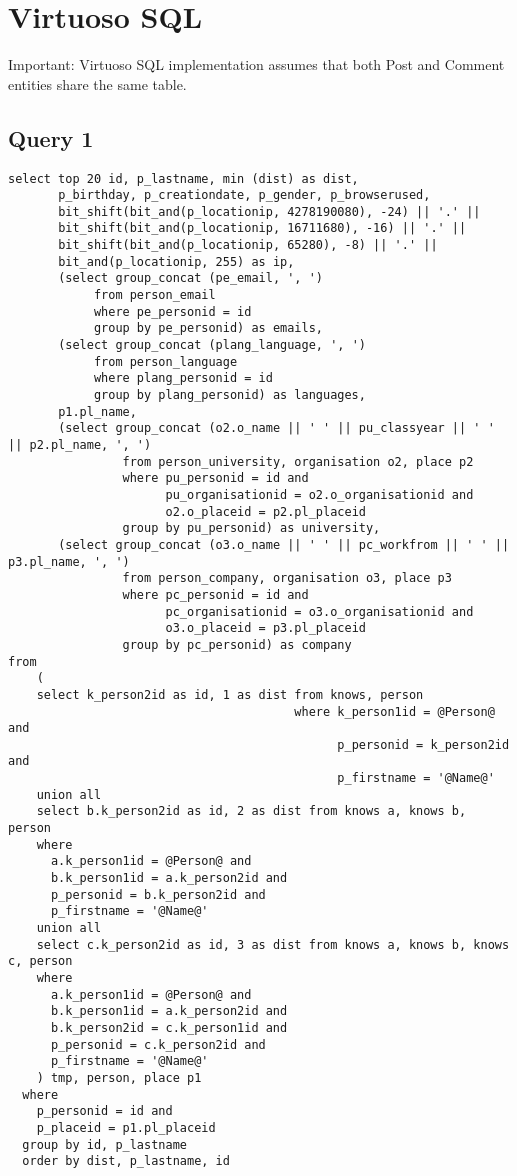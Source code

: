 \section{Virtuoso SQL}
Important: Virtuoso SQL implementation assumes that both Post and Comment entities share the same table.
\subsection{Query 1}

{\footnotesize
\begin{verbatim}
select top 20 id, p_lastname, min (dist) as dist,
       p_birthday, p_creationdate, p_gender, p_browserused,
       bit_shift(bit_and(p_locationip, 4278190080), -24) || '.' ||
       bit_shift(bit_and(p_locationip, 16711680), -16) || '.' ||
       bit_shift(bit_and(p_locationip, 65280), -8) || '.' ||
       bit_and(p_locationip, 255) as ip,
       (select group_concat (pe_email, ', ') 
            from person_email 
            where pe_personid = id 
            group by pe_personid) as emails,
       (select group_concat (plang_language, ', ') 
            from person_language
            where plang_personid = id
            group by plang_personid) as languages,
       p1.pl_name,
       (select group_concat (o2.o_name || ' ' || pu_classyear || ' ' || p2.pl_name, ', ') 
                from person_university, organisation o2, place p2  
                where pu_personid = id and 
                      pu_organisationid = o2.o_organisationid and
                      o2.o_placeid = p2.pl_placeid 
                group by pu_personid) as university,
       (select group_concat (o3.o_name || ' ' || pc_workfrom || ' ' || p3.pl_name, ', ') 
                from person_company, organisation o3, place p3
                where pc_personid = id and 
                      pc_organisationid = o3.o_organisationid and 
                      o3.o_placeid = p3.pl_placeid 
                group by pc_personid) as company
from
    (
    select k_person2id as id, 1 as dist from knows, person 
                                        where k_person1id = @Person@ and 
                                              p_personid = k_person2id and 
                                              p_firstname = '@Name@'
    union all
    select b.k_person2id as id, 2 as dist from knows a, knows b, person
    where
      a.k_person1id = @Person@ and 
      b.k_person1id = a.k_person2id and 
      p_personid = b.k_person2id and 
      p_firstname = '@Name@'
    union all
    select c.k_person2id as id, 3 as dist from knows a, knows b, knows c, person
    where
      a.k_person1id = @Person@ and 
      b.k_person1id = a.k_person2id and 
      b.k_person2id = c.k_person1id and 
      p_personid = c.k_person2id and
      p_firstname = '@Name@'
    ) tmp, person, place p1
  where
    p_personid = id and
    p_placeid = p1.pl_placeid
  group by id, p_lastname
  order by dist, p_lastname, id
\end{verbatim}
}
 

